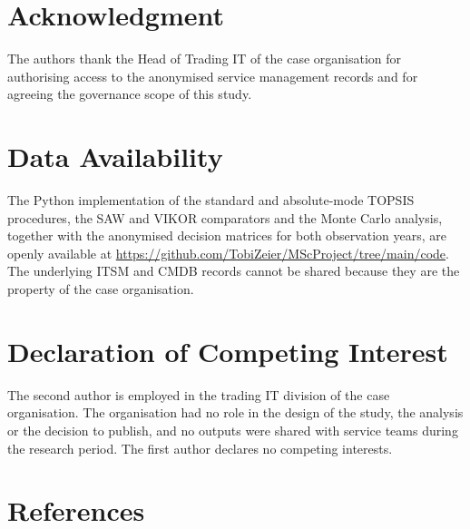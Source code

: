 \documentclass[
  journal,
]{IEEEtran}%
\begin{document}
\section*{Acknowledgment}\label{acknowledgment}

The authors thank the Head of Trading IT of the case organisation for
authorising access to the anonymised service management records and for
agreeing the governance scope of this study.

\section*{Data Availability}\label{data-availability}

The Python implementation of the standard and absolute-mode TOPSIS
procedures, the SAW and VIKOR comparators and the Monte Carlo analysis,
together with the anonymised decision matrices for both observation
years, are openly available at
\url{https://github.com/TobiZeier/MScProject/tree/main/code}. The
underlying ITSM and CMDB records cannot be shared because they are the
property of the case organisation.

\section*{Declaration of Competing
Interest}\label{declaration-of-competing-interest}

The second author is employed in the trading IT division of the case
organisation. The organisation had no role in the design of the study,
the analysis or the decision to publish, and no outputs were shared with
service teams during the research period. The first author declares no
competing interests.

\section*{References}\label{references}
\end{document}
